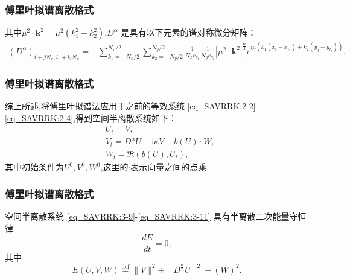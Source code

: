 \documentclass[aspectratio=169]{beamer}
\begin{document}
\begin{frame}\frametitle{傅里叶拟谱离散格式}
其中$\mu^{2} \cdot \mathbf{k}^{2}=\mu^{2}\left(k_{1}^{2}+k_{2}^{2}\right)$,$D^{\alpha}$ 是具有以下元素的谱对称微分矩阵：
\begin{align}\label{eq_SAVRRK:54}
\left(D^{\alpha}\right)_{i+j N_{x}, l_{1}+l_{2} N_{x}}=-\sum\limits_{k_{1}=-N_{x} / 2}^{N_{x} / 2} \sum\limits_{k_{2}=-N_{y} / 2}^{N_{y} / 2}\frac{1}{N_{x} c_{k_{1}}} \frac{1}{N_{y} c_{k_{2}}}\left|\mu^{2} \cdot \mathbf{k}^{2}\right|^{\frac{\alpha}{2}} e^{\mathrm{i}\mu\left(k_{1}\left(x_{i}-x_{l_{1}}\right)+k_{2}\left(y_{j}-y_{l_{2}}\right)\right)}.
\end{align}
\end{frame}

\begin{frame}\frametitle{傅里叶拟谱离散格式}
综上所述,将傅里叶拟谱法应用于之前的等效系统 \eqref{eq_SAVRRK:2-2} - \eqref{eq_SAVRRK:2-4},得到空间半离散系统如下：
\begin{align}
& U_t=V, \label{eq_SAVRRK:3-9}\\
& V_t=D^{\alpha} U-\mathrm{i}\kappa V- b(U) \cdot W, \label{eq_SAVRRK:3-10}\\
& W_t=\Re\left(b(U), U_t\right),\label{eq_SAVRRK:3-11}
\end{align}
其中初始条件为$U^0, V^0, W^0$,这里的$\cdot$表示向量之间的点乘.
\end{frame}

\begin{frame}\frametitle{傅里叶拟谱离散格式}

	\begin{theorem}	\label{thm3}
		空间半离散系统 \eqref{eq_SAVRRK:3-9}-\eqref{eq_SAVRRK:3-11} 具有半离散二次能量守恒律
		\begin{equation}
		\frac{dE}{dt}=0, \label{eq_SAVRRK:313a}
		\end{equation}
		其中
		\begin{equation}
		E(U,V,W)\overset{\text{def}}{=}\|V\|^2 + \|D^\frac{\alpha}{2} U\|^2+\left(W\right)^2.\label{eq_SAVRRK:313}
		\end{equation}
		\end{theorem}
	\end{frame}
\end{document}
